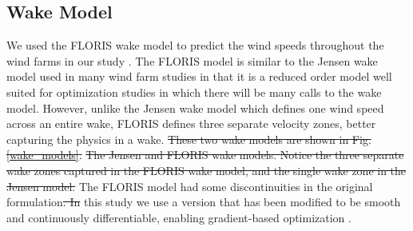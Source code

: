 \documentclass[wes, manuscript]{copernicus}
\providecommand{\DIFadd}[1]{{\protect\color{blue}\uwave{#1}}} %
\providecommand{\DIFdel}[1]{{\protect\color{red}\sout{#1}}}                      %
\providecommand{\DIFaddbegin}{} %
\providecommand{\DIFaddend}{} %
\providecommand{\DIFdelbegin}{} %
\providecommand{\DIFdelend}{} %
\providecommand{\DIFdelFL}[1]{\DIFdel{#1}} %
\begin{document}
	\subsection{Wake Model}
	We used the FLORIS wake model to predict the wind speeds throughout the wind farms in our study \citep{gebraad2016wind}. The FLORIS model is similar to the Jensen wake model used in many wind farm studies \citep{jensen1983note} in that it is a reduced order model well suited for optimization studies in which there will be many calls to the wake model. However, unlike the Jensen wake model which defines one wind speed across an entire wake, FLORIS defines three separate velocity zones, better capturing the physics in a wake. 
\DIFdelbegin \DIFdel{These two wake models are shown in Fig. \ref{wake_models}.
}\DIFdelend %
\DIFdelbegin %
{%
\DIFdelFL{The Jensen and FLORIS wake models. Notice the three separate wake zones captured in the FLORIS wake model, and the single wake zone in the Jensen model.}}
\DIFdelend %
The FLORIS model had some discontinuities in the original formulation\DIFdelbegin \DIFdel{. In }\DIFdelend \DIFaddbegin \DIFadd{, so in }\DIFaddend this study we use a version that has been modified to be smooth and continuously differentiable, enabling gradient-based optimization \citep{thomas2017improving}.
\end{document}
